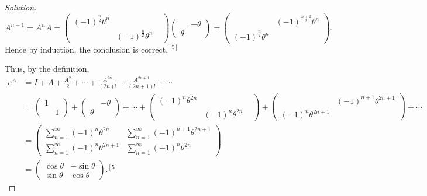 \documentclass{article}
\theoremstyle{definition}
\theoremstyle{plain}
\begin{document}
\begin{adjustwidth}{0.7cm}{}
\begin{proof}[Solution]
\begin{displaymath}
A^{n+1}=A^nA=\begin{pmatrix}(-1)^\frac{n}{2}\theta^n&\\ &(-1)^\frac{n}{2}\theta^n&\end{pmatrix}\begin{pmatrix}&-\theta\\ \theta&\end{pmatrix}=\begin{pmatrix}&(-1)^\frac{n+2}{2}\theta^n\\ (-1)^\frac{n}{2}\theta^n&\end{pmatrix}.
\end{displaymath}
Hence by induction, the conclusion is correct$.^{[5]}$\par
Thus, by the definition,
\begin{align*}
e^A&=I+A+\frac{A^2}{2}+\cdots+\frac{A^{2n}}{(2n)!}+\frac{A^{2n+1}}{(2n+1)!}+\cdots\\
&=\begin{pmatrix}1&\\ &1\end{pmatrix}+\begin{pmatrix}&-\theta\\ \theta&\end{pmatrix}+\cdots+\begin{pmatrix}(-1)^n\theta^{2n}&\\ &(-1)^n\theta^{2n}&\end{pmatrix}+\begin{pmatrix}&(-1)^{n+1}\theta^{2n+1}\\ (-1)^n\theta^{2n+1}&\end{pmatrix}+\cdots\\
&=\begin{pmatrix}\sum_{n=1}^{\infty}(-1)^n\theta^{2n}&\sum_{n=1}^{\infty}(-1)^{n+1}\theta^{2n+1}\\ \sum_{n=1}^{\infty}(-1)^n\theta^{2n+1}&\sum_{n=1}^{\infty}(-1)^n\theta^{2n}\end{pmatrix}\\
&=\begin{pmatrix}\cos\theta&-\sin\theta\\ \sin\theta&\cos\theta\end{pmatrix}.^{[5]}
\end{align*}
\color{black}
\end{proof}
\end{adjustwidth}
\end{document}
